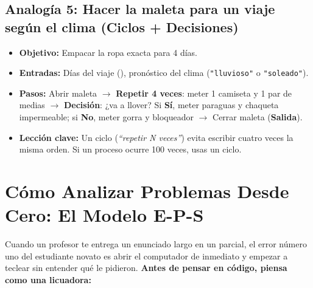 \documentclass[11pt,letterpaper]{article}
\begin{document}
\subsection{Analogía 5: Hacer la maleta para un viaje según el clima (Ciclos + Decisiones)}
\begin{itemize}
  \item \textbf{Objetivo:} Empacar la ropa exacta para 4 días.
  \item \textbf{Entradas:} Días del viaje (), pronóstico del clima (\texttt{"lluvioso"} o \texttt{"soleado"}).
  \item \textbf{Pasos:} Abrir maleta $\rightarrow$ \textbf{Repetir 4 veces}: meter 1 camiseta y 1 par de medias $\rightarrow$ \textbf{Decisión}: ¿va a llover? Si \textbf{Sí}, meter paraguas y chaqueta impermeable; si \textbf{No}, meter gorra y bloqueador $\rightarrow$ Cerrar maleta (\textbf{Salida}).
  \item \textbf{Lección clave:} Un ciclo (\textit{``repetir N veces''}) evita escribir cuatro veces la misma orden. Si un proceso ocurre 100 veces, usas un ciclo.
\end{itemize}

\section{Cómo Analizar Problemas Desde Cero: El Modelo E-P-S}

Cuando un profesor te entrega un enunciado largo en un parcial, el error número uno del estudiante novato es abrir el computador de inmediato y empezar a teclear sin entender qué le pidieron. \textbf{Antes de pensar en código, piensa como una licuadora:}

\begin{center}
\end{center}
\end{document}
